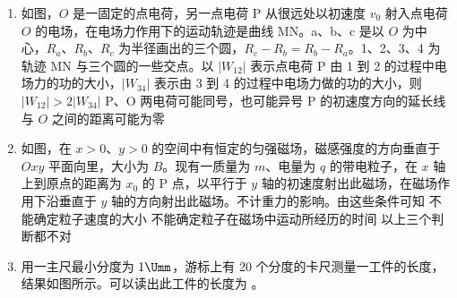 \documentclass[\gkver]{gaokaozhenti}
\begin{document}
\begin{enumerate}
\item
如图，$O$ 是一固定的点电荷，另一点电荷 P 从很远处以初速度 $v_{0}$ 射入点电荷 $O$ 的电场，在电场力作用下的运动轨迹是曲线 MN。a、b、c 是以 $O$ 为中心，$R_{a}$、$R_{b}$、$R_{c}$ 为半径画出的三个圆，$R_{c}-R_{b}=R_{b}-R_{a}$。1、2、3、4 为轨迹 MN 与三个圆的一些交点。以 $|W_{12}|$ 表示点电荷 P 由 1 到 2 的过程中电场力的功的大小，$|W_{34}|$ 表示由 3 到 4 的过程中电场力做的功的大小，则
{$|W_{12}|>2|W_{34}|$}
{P、O 两电荷可能同号，也可能异号}
{P 的初速度方向的延长线与 $O$ 之间的距离可能为零}

\item
如图，在 $x>0$、$y>0$ 的空间中有恒定的匀强磁场，磁感强度的方向垂直于 $Oxy$ 平面向里，大小为 $B$。现有一质量为 $m$、电量为 $q$ 的带电粒子，在 $x$ 轴上到原点的距离为 $x_{0}$ 的 P 点，以平行于 $y$ 轴的初速度射出此磁场，在磁场作用下沿垂直于 $y$ 轴的方向射出此磁场。不计重力的影响。由这些条件可知
{不能确定粒子速度的大小}
{不能确定粒子在磁场中运动所经历的时间}
{以上三个判断都不对}

\item
用一主尺最小分度为 $1\Umm$，游标上有 20 个分度的卡尺测量一工件的长度，结果如图所示。可以读出此工件的长度为 \tkanswer[2.5cm]{$10.405\Ucm$}。


\end{enumerate}
\end{document}
